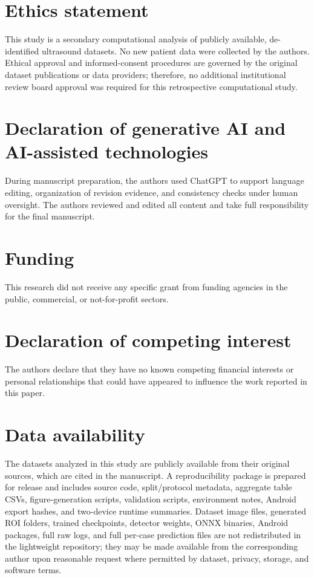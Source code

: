 \documentclass[preprint,12pt]{elsarticle}
\begin{document}
\section*{Ethics statement}
This study is a secondary computational analysis of publicly available, de-identified ultrasound datasets. No new patient data were collected by the authors. Ethical approval and informed-consent procedures are governed by the original dataset publications or data providers; therefore, no additional institutional review board approval was required for this retrospective computational study.

\section*{Declaration of generative AI and AI-assisted technologies}
During manuscript preparation, the authors used ChatGPT to support language editing, organization of revision evidence, and consistency checks under human oversight. The authors reviewed and edited all content and take full responsibility for the final manuscript.

\section*{Funding}
This research did not receive any specific grant from funding agencies in the public, commercial, or not-for-profit sectors.

\section*{Declaration of competing interest}
The authors declare that they have no known competing financial interests or personal relationships that could have appeared to influence the work reported in this paper.

\section*{Data availability}
The datasets analyzed in this study are publicly available from their original sources, which are cited in the manuscript. A reproducibility package is prepared for release and includes source code, split/protocol metadata, aggregate table CSVs, figure-generation scripts, validation scripts, environment notes, Android export hashes, and two-device runtime summaries. Dataset image files, generated ROI folders, trained checkpoints, detector weights, ONNX binaries, Android packages, full raw logs, and full per-case prediction files are not redistributed in the lightweight repository; they may be made available from the corresponding author upon reasonable request where permitted by dataset, privacy, storage, and software terms.



\end{document}
